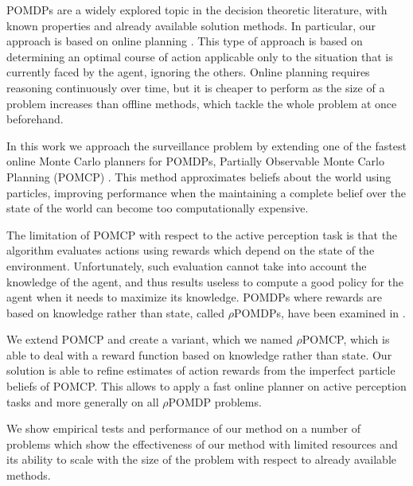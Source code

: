 POMDPs are a widely explored topic in the decision theoretic literature, with known properties and
already available solution methods. In particular, our approach is based on online planning
\cite{cit:relworkonlineall}. This type of approach is based on determining an optimal course of
action applicable only to the situation that is currently faced by the agent, ignoring the others.
Online planning requires reasoning continuously over time, but it is cheaper to perform as the size
of a problem increases than offline methods, which tackle the whole problem at once beforehand.


In this work we approach the surveillance problem by extending one of the fastest online Monte Carlo
planners for POMDPs, Partially Observable Monte Carlo Planning (POMCP) \cite{cit:pomcp}. This
method approximates beliefs about the world using particles, improving performance when the
maintaining a complete belief over the state of the world can become too computationally expensive.

The limitation of POMCP with respect to the active perception task is that the algorithm evaluates
actions using rewards which depend on the state of the environment. Unfortunately, such evaluation
cannot take into account the knowledge of the agent, and thus results useless to compute a good
policy for the agent when it needs to maximize its knowledge. POMDPs where rewards are based on
knowledge rather than state, called $\rho$POMDPs, have been examined in \cite{cit:rpomdp}.


We extend POMCP and create a variant, which we named $\rho$POMCP, which is able to deal with a
reward function based on knowledge rather than state. Our solution is able to refine estimates of
action rewards from the imperfect particle beliefs of POMCP. This allows to apply a fast online
planner on active perception tasks and more generally on all $\rho$POMDP problems.


We show empirical tests and performance of our method on a number of problems which show the
effectiveness of our method with limited resources and its ability to scale with the size of the
problem with respect to already available methods.

